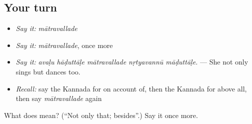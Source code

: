 \subsection*{Your turn}
\begin{itemize}
\raggedright
  \item \emph{Say it:} \emph{mātravallade}
  \item \emph{Say it:} \emph{mātravallade}, once more
  \item \emph{Say it:} \emph{avaḷu hāḍuttāḷe mātravallade nṛtyavannū māḍuttāḷe.} — She not only sings but dances too.
  \item \emph{Recall:} say the Kannada for on account of, then the Kannada for above all, then say \emph{mātravallade} again
\end{itemize}

\begin{tcolorbox}[breakable,colback=teal!4,colframe=teal!35!black,title={Before you move on}]
What does  mean? (\textquotedblleft{}Not only that; besides\textquotedblright{}.) Say it once more.
\end{tcolorbox}
